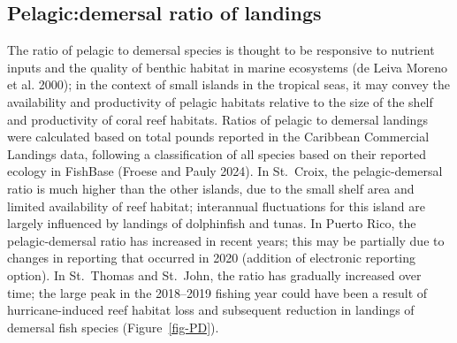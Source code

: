 \documentclass[
  letterpaper,
  oneside,
  open=any]{scrbook}
\begin{document}
\subsection{Pelagic:demersal ratio of
landings}\label{pelagicdemersal-ratio-of-landings}

The ratio of pelagic to demersal species is thought to be responsive to
nutrient inputs and the quality of benthic habitat in marine ecosystems
(de Leiva Moreno et al. 2000); in the context of small islands in the
tropical seas, it may convey the availability and productivity of
pelagic habitats relative to the size of the shelf and productivity of
coral reef habitats. Ratios of pelagic to demersal landings were
calculated based on total pounds reported in the Caribbean Commercial
Landings data, following a classification of all species based on their
reported ecology in FishBase (Froese and Pauly 2024). In St.~Croix, the
pelagic-demersal ratio is much higher than the other islands, due to the
small shelf area and limited availability of reef habitat; interannual
fluctuations for this island are largely influenced by landings of
dolphinfish and tunas. In Puerto Rico, the pelagic-demersal ratio has
increased in recent years; this may be partially due to changes in
reporting that occurred in 2020 (addition of electronic reporting
option). In St.~Thomas and St.~John, the ratio has gradually increased
over time; the large peak in the 2018--2019 fishing year could have been
a result of hurricane-induced reef habitat loss and subsequent reduction
in landings of demersal fish species (Figure~\ref{fig-PD}).
\end{document}
